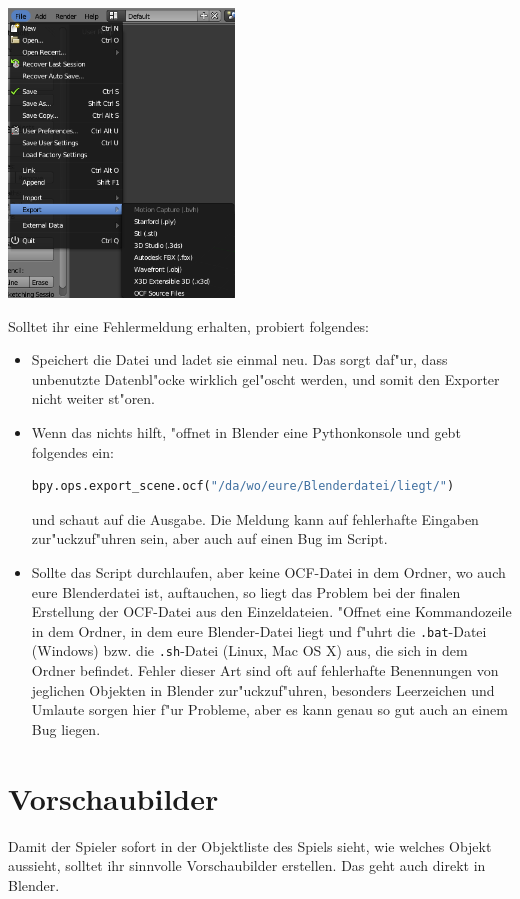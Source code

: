 \documentclass[a4paper]{article}
\newcommand{\cfile}[1]{\texttt{#1}}
\begin{document}
\begin{center}
\includegraphics[width=60mm]{../images/blender/blender-menu.png}
\end{center}

Solltet ihr eine Fehlermeldung erhalten, probiert folgendes:
\begin{itemize}
\item Speichert die Datei und ladet sie einmal neu. Das sorgt daf"ur, dass unbenutzte Datenbl"ocke wirklich gel"oscht werden, und somit den Exporter nicht
  weiter st"oren.
\item Wenn das nichts hilft, "offnet in Blender eine Pythonkonsole und gebt folgendes ein:
  \begin{lstlisting}[language=python]
  bpy.ops.export_scene.ocf("/da/wo/eure/Blenderdatei/liegt/")
  \end{lstlisting}
  und schaut auf die Ausgabe. Die Meldung kann auf fehlerhafte Eingaben zur"uckzuf"uhren sein, aber auch auf einen Bug im Script.
\item Sollte das Script durchlaufen, aber keine OCF-Datei in dem Ordner, wo auch eure Blenderdatei ist, auftauchen, so liegt das Problem bei der finalen
  Erstellung der OCF-Datei aus den Einzeldateien. "Offnet eine Kommandozeile in dem Ordner, in dem eure Blender-Datei liegt und f"uhrt die
  \cfile{.bat}-Datei (Windows) bzw. die \cfile{.sh}-Datei (Linux, Mac OS X) aus, die sich in dem Ordner befindet. Fehler dieser Art sind oft auf
  fehlerhafte Benennungen von jeglichen Objekten in Blender zur"uckzuf"uhren, besonders Leerzeichen und Umlaute sorgen hier f"ur Probleme, aber es kann
  genau so gut auch an einem Bug liegen.
\end{itemize}

\section{Vorschaubilder}
Damit der Spieler sofort in der Objektliste des Spiels sieht, wie welches Objekt aussieht, solltet ihr sinnvolle Vorschaubilder erstellen. Das geht auch
direkt in Blender.
\end{document}
